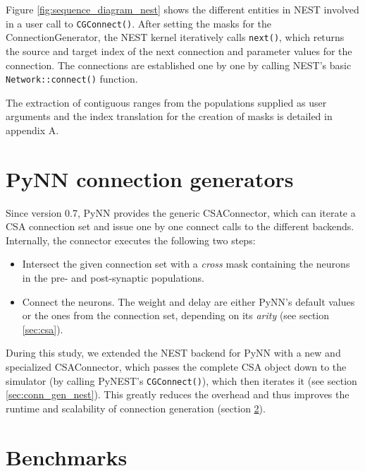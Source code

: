 \documentclass{frontiersSCNS} %
\begin{document}
Figure \ref{fig:sequence_diagram_nest} shows the different entities in
NEST involved in a user call to \verb|CGConnect()|. After setting the
masks for the ConnectionGenerator, the NEST kernel iteratively calls
\verb|next()|, which returns the source and target index of the next
connection and parameter values for the connection. The connections
are established one by one by calling NEST's basic
\verb|Network::connect()| function.

The extraction of contiguous ranges from the populations supplied as
user arguments and the index translation for the creation of masks is
detailed in appendix A.


\section{PyNN connection generators}\label{sec:conn_gen_pynn}

Since version 0.7, PyNN provides the generic CSAConnector, which can
iterate a CSA connection set and issue one by one connect calls to
the different backends. Internally, the connector executes the
following two steps:
\begin{itemize}
\item Intersect the given connection set with a \emph{cross} mask
  containing the neurons in the pre- and post-synaptic populations.
\item Connect the neurons. The weight and delay are either PyNN's
  default values or the ones from the connection set, depending on its
  \emph{arity} (see section \ref{sec:csa}).
\end{itemize}

During this study, we extended the NEST backend for PyNN with a new
and specialized CSAConnector, which passes the complete CSA object
down to the simulator (by calling PyNEST's \verb|CGConnect()|), which
then iterates it (see section \ref{sec:conn_gen_nest}). This greatly
reduces the overhead and thus improves the runtime and scalability of
connection generation (section \ref{sec:benchmarks}).


\section{Benchmarks}\label{sec:benchmarks}
\end{document}
